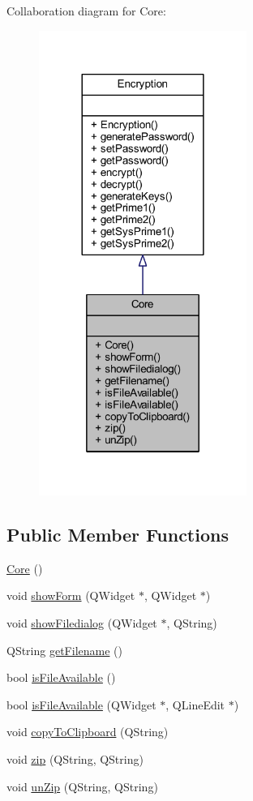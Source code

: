Collaboration diagram for Core\+:
\nopagebreak
\begin{figure}[H]
\begin{center}
\leavevmode
\includegraphics[width=192pt]{class_core__coll__graph}
\end{center}
\end{figure}
\subsection*{Public Member Functions}
\begin{DoxyCompactItemize}
\item 
\hyperlink{class_core_a14e63188e0aa7c4a6f72d5501384d1f9}{Core} ()
\item 
void \hyperlink{class_core_ad3503f8f37ca8f8f31bbdefb273a9f78}{show\+Form} (Q\+Widget $\ast$, Q\+Widget $\ast$)
\item 
void \hyperlink{class_core_adf62d4f996b0cb94dba269110b136dc1}{show\+Filedialog} (Q\+Widget $\ast$, Q\+String)
\item 
Q\+String \hyperlink{class_core_aa75cf5dbf2f48a261a8596c42cf99946}{get\+Filename} ()
\item 
bool \hyperlink{class_core_a97c1ce83217497c5000ab5454628b7b2}{is\+File\+Available} ()
\item 
bool \hyperlink{class_core_a87e3e55dfb83db550283f160a5f9fd76}{is\+File\+Available} (Q\+Widget $\ast$, Q\+Line\+Edit $\ast$)
\item 
void \hyperlink{class_core_a3f943c730fb3d550dd4d7f82667beebb}{copy\+To\+Clipboard} (Q\+String)
\item 
void \hyperlink{class_core_aa48d61e2fd30740e21ff228b8ee54dc1}{zip} (Q\+String, Q\+String)
\item 
void \hyperlink{class_core_a76ef88295ccbf20180de6273a2d387bc}{un\+Zip} (Q\+String, Q\+String)
\end{DoxyCompactItemize}


